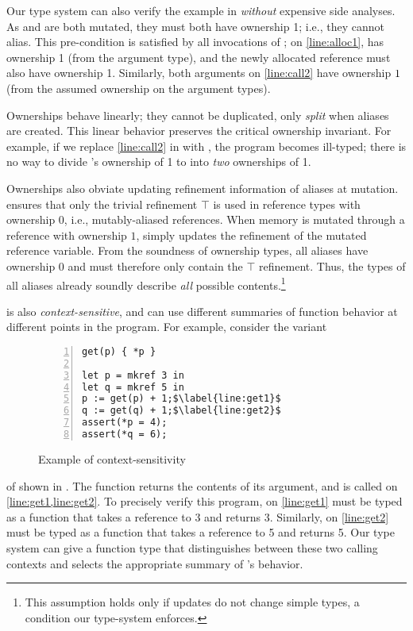 Our type system can also verify the example in
 \emph{without} expensive
side analyses. As  and  are both
mutated, they must both have ownership 1; i.e., they cannot alias.
This pre-condition is satisfied by all invocations of ;
on \cref{line:alloc1},  has
ownership 1 (from the argument type), and the newly allocated
reference must also have ownership 1.
Similarly, both arguments on \cref{line:call2} have ownership $1$
(from the assumed ownership on the argument types). %

Ownerships behave linearly;
they cannot be duplicated, only \emph{split}
when aliases are created. This linear behavior
preserves the critical ownership invariant. For example, if
we replace \cref{line:call2} in  with
, the program becomes ill-typed; there
is no way to divide 's ownership of 1 to into \emph{two}
ownerships of 1.

Ownerships also obviate updating refinement information
of aliases at mutation. \name ensures that only the trivial refinement
$ \top $ is used in reference types with ownership $0$, i.e., mutably-aliased references.
When memory is mutated through a reference with ownership $1$,
\name simply updates the refinement of the mutated reference variable.
From the soundness of ownership types, all aliases have ownership 0
and must therefore only contain the $ \top $ refinement. Thus, the types of all aliases already
soundly describe \emph{all} possible contents.\footnote{This
  assumption holds only if updates do not change simple types, a condition our type-system enforces.}

\name is also \emph{context-sensitive}, and can
use different summaries of function behavior
at different points in the program.
For example, consider the variant
\begin{wrapfigure}{l}{0.29\textwidth}
  \begin{lstlisting}[numbers=left,numbersep=3pt,numberstyle=\tiny\color{black},numberblanklines=false]
get(p) { *p }

let p = mkref 3 in
let q = mkref 5 in
p := get(p) + 1;$\label{line:get1}$
q := get(q) + 1;$\label{line:get2}$
assert(*p = 4);
assert(*q = 6);
  \end{lstlisting}
  \caption{Example of context-sensitivity}
  \label{fig:running-example}
\end{wrapfigure}
of 
shown in .
The function  returns the contents of its argument,
and is called on \cref{line:get1,line:get2}. To precisely verify
this program, on \cref{line:get1}
 must be typed as a function that takes a reference to
3 and returns 3. Similarly, on \cref{line:get2}
 must be typed as a function that
takes a reference to 5 and returns 5. Our type system can
give  a function type that distinguishes between these two calling
contexts and selects the appropriate summary of 's behavior.

